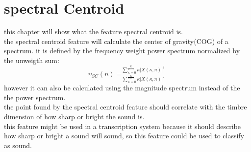 \section{spectral Centroid}
this chapter will show what the feature spectral centroid is.\\
the spectral centroid feature will calculate the center of gravity(COG) of a spectrum. it is defined by the frequency weight power spectrum normalized by the unweigth sum:
\begin{equation}
	\upsilon_{SC}(n) =^{ \sum_{\kappa = 0}^{\frac{K}{2-1}} \kappa\vert X(\kappa,n) \vert^2  }_{ \sum_{\kappa = 0}^{\frac{K}{2-1}} \kappa\vert X(\kappa,n) \vert^2  } 
\end{equation} 
however it can also be calculated using the magnitude spectrum instead of the the power spectrum.
\\
the point found by the spectral centroid feature should correlate with the timbre dimension of how sharp or bright the sound is. 
\\
this feature might be used in a transcription system because it should describe how sharp or bright a sound will sound, so this feature could be used to classify as sound. 